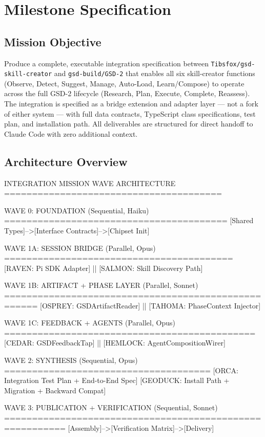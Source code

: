 \documentclass[11pt,letterpaper]{article}
\newcommand{\stageheader}[2]{%
  \noindent\colorbox{#2}{\makebox[\textwidth][l]{%
    \textcolor{white}{\bfseries\sffamily\hspace{6pt}#1\hspace{6pt}}}}%
  \vspace{0.5em}\par%
}
\begin{document}
\newpage

\stageheader{STAGE 3 --- MISSION PACKAGE}{tertiary}

\section{Milestone Specification}

\subsection{Mission Objective}

Produce a complete, executable integration specification between \texttt{Tibsfox/gsd-skill-creator} and \texttt{gsd-build/GSD-2} that enables all six skill-creator functions (Observe, Detect, Suggest, Manage, Auto-Load, Learn/Compose) to operate across the full GSD-2 lifecycle (Research, Plan, Execute, Complete, Reassess). The integration is specified as a bridge extension and adapter layer --- not a fork of either system --- with full data contracts, TypeScript class specifications, test plan, and installation path. All deliverables are structured for direct handoff to Claude Code with zero additional context.

\subsection{Architecture Overview}

\begin{asciibox}
INTEGRATION MISSION WAVE ARCHITECTURE
=======================================

  WAVE 0: FOUNDATION (Sequential, Haiku)
  ========================================
  [Shared Types]-->[Interface Contracts]-->[Chipset Init]

  WAVE 1A: SESSION BRIDGE (Parallel, Opus)
  =========================================
  [RAVEN: Pi SDK Adapter]  ||  [SALMON: Skill Discovery Path]

  WAVE 1B: ARTIFACT + PHASE LAYER (Parallel, Sonnet)
  ====================================================
  [OSPREY: GSDArtifactReader]  ||  [TAHOMA: PhaseContext Injector]

  WAVE 1C: FEEDBACK + AGENTS (Parallel, Opus)
  =============================================
  [CEDAR: GSDFeedbackTap]  ||  [HEMLOCK: AgentCompositionWirer]

  WAVE 2: SYNTHESIS (Sequential, Opus)
  =====================================
  [ORCA: Integration Test Plan + End-to-End Spec]
  [GEODUCK: Install Path + Migration + Backward Compat]

  WAVE 3: PUBLICATION + VERIFICATION (Sequential, Sonnet)
  =========================================================
  [Assembly]-->[Verification Matrix]-->[Delivery]
\end{asciibox}
\end{document}
